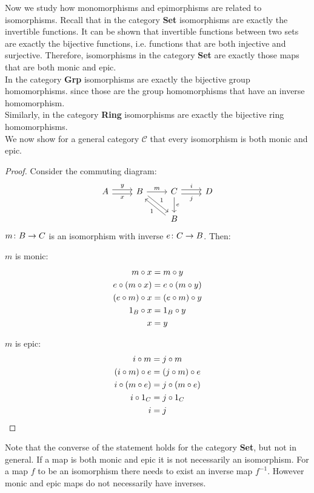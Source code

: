 Now we study how monomorphisms and epimorphisms are related to isomorphisms.
Recall that in the category \textbf{Set} isomorphisms are exactly the invertible functions.
It can be shown that invertible functions between two sets are
exactly the bijective functions, i.e. functions that are both injective and surjective.
Therefore, isomorphisms in the category \textbf{Set} are exactly those maps that are both monic and epic.\\
In the category \textbf{Grp} isomorphisms are exactly the bijective group homomorphisms.
since those are the group homomorphisms that have an inverse homomorphism.\\
Similarly, in the category \textbf{Ring} isomorphisms are exactly the bijective ring homomorphisms.\\
We now show for a general category $\mathscr{C}$ that every isomorphism is both monic and epic.
\begin{proof}
  Consider the commuting diagram:
  \[
    \begin{tikzcd}
      A \arrow[r,shift left, "y"] \arrow[r,shift right,swap,"x"] &
      B \arrow[dr, shift left, "1"]  \arrow{r}{m}  &
      C \arrow{d}{e} \arrow[r,shift left, "i"] \arrow[r,shift right,swap,"j"] & D\\
      &  & B \arrow[ul, shift left, "1"]&
    \end{tikzcd}
  \]
  $m \from B \to C$ is an isomorphism with inverse $e \from C \to B$.
  Then:\\
  \begin{minipage}{.5\linewidth}
    \vspace{4mm}
    \centering $m$ is monic:
    \[
      \begin{aligned}
        m \mathbin{\circ} x &= m \mathbin{\circ} y\\
        e \mathbin{\circ} (m \mathbin{\circ} x) &= e \mathbin{\circ} (m \mathbin{\circ} y)\\
        (e \mathbin{\circ} m) \mathbin{\circ} x &= (e \mathbin{\circ} m) \mathbin{\circ} y\\
        1_B \mathbin{\circ} x &= 1_B \mathbin{\circ} y\\
        x &= y
      \end{aligned}
    \]
  \end{minipage}%
  \begin{minipage}{.5\linewidth}
    \vspace{4mm}
    \centering $m$ is epic:
    \[
      \begin{aligned}
        i \mathbin{\circ} m &= j \mathbin{\circ} m \\
        (i \mathbin{\circ} m) \mathbin{\circ} e &= (j \mathbin{\circ} m) \mathbin{\circ} e\\
        i \mathbin{\circ} (m \mathbin{\circ} e) &= j \mathbin{\circ} (m \mathbin{\circ} e)\\
        i \mathbin{\circ} 1_C &= j \mathbin{\circ} 1_C\\
        i &= j
      \end{aligned}
    \]
  \end{minipage}%
\end{proof}
Note that the converse of the statement holds for the category \textbf{Set}, but not in general.
If a map is both monic and epic it is not necessarily an isomorphism.
For a map $f$ to be an isomorphism there needs to exist an inverse map $f^{-1}$.
However monic and epic maps do not necessarily have inverses.\\[1mm]


